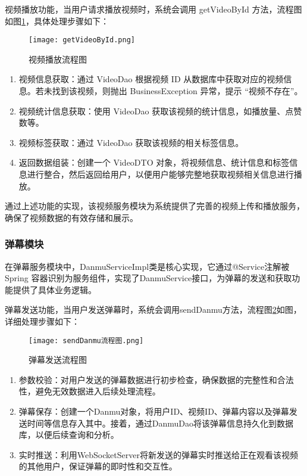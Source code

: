 \newpage

视频播放功能，当用户请求播放视频时，系统会调用 getVideoById 方法，流程图如图\ref{视频播放流程图}，具体处理步骤如下：

\begin{figure}[hbt]
    \centering
    \texttt{[image: getVideoById.png]}
    \caption{视频播放流程图}
    \label{视频播放流程图}
\end{figure}

\begin{enumerate}[label=(\arabic*)]
    \item 视频信息获取：通过 VideoDao 根据视频 ID 从数据库中获取对应的视频信息。若未找到该视频，则抛出 BusinessException 异常，提示 “视频不存在”。
    \item 视频统计信息获取：使用 VideoDao 获取该视频的统计信息，如播放量、点赞数等。
    \item 视频标签获取：通过 VideoDao 获取该视频的相关标签信息。
    \item 返回数据组装：创建一个 VideoDTO 对象，将视频信息、统计信息和标签信息进行整合，然后返回给用户，以便用户能够完整地获取视频相关信息进行播放。
\end{enumerate}

通过上述功能的实现，该视频服务模块为系统提供了完善的视频上传和播放服务，确保了视频数据的有效存储和展示。

\subsubsection{弹幕模块}
在弹幕服务模块中，DanmuServiceImpl类是核心实现，它通过@Service注解被 Spring 容器识别为服务组件，实现了DanmuService接口，为弹幕的发送和获取功能提供了具体业务逻辑。

弹幕发送功能，当用户发送弹幕时，系统会调用sendDanmu方法，流程图\ref{弹幕发送流程图}如图，详细处理步骤如下：

\begin{figure}[hbt]
    \centering
    \texttt{[image: sendDanmu流程图.png]}
    \caption{弹幕发送流程图}
    \label{弹幕发送流程图}
\end{figure}

\begin{enumerate}[label=(\arabic*)]
    \item 参数校验：对用户发送的弹幕数据进行初步检查，确保数据的完整性和合法性，避免无效数据进入后续处理流程。
    \item 弹幕保存：创建一个Danmu对象，将用户ID、视频ID、弹幕内容以及弹幕发送时间等信息存入其中。接着，通过DanmuDao将该弹幕信息持久化到数据库，以便后续查询和分析。
    \item 实时推送：利用WebSocketServer将新发送的弹幕实时推送给正在观看该视频的其他用户，保证弹幕的即时性和交互性。
\end{enumerate}

